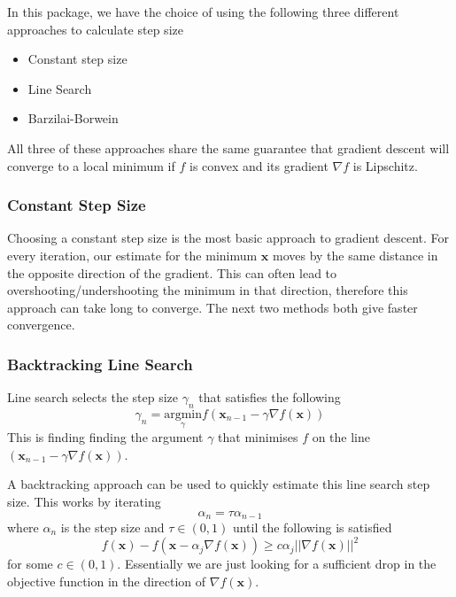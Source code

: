 \documentclass[12pt,]{article}
\providecommand{\tightlist}{%
  \setlength{\itemsep}{0pt}\setlength{\parskip}{0pt}}
\begin{document}
In this package, we have the choice of using the following three
different approaches to calculate step size

\begin{itemize}
\tightlist
\item
  Constant step size
\item
  Line Search
\item
  Barzilai-Borwein
\end{itemize}

All three of these approaches share the same guarantee that gradient
descent will converge to a local minimum if \(f\) is convex and its
gradient \(\nabla f\) is Lipschitz.

\hypertarget{constant-step-size}{%
\subsubsection{Constant Step Size}\label{constant-step-size}}

Choosing a constant step size is the most basic approach to gradient
descent. For every iteration, our estimate for the minimum
\(\mathbf{x}\) moves by the same distance in the opposite direction of
the gradient. This can often lead to overshooting/undershooting the
minimum in that direction, therefore this approach can take long to
converge. The next two methods both give faster convergence.

\hypertarget{backtracking-line-search}{%
\subsubsection{Backtracking Line
Search}\label{backtracking-line-search}}

Line search selects the step size \(\gamma_n\) that satisfies the
following
\[ \gamma_n = \underset{\gamma}{\text{argmin}} f(\mathbf{x}_{n-1} - \gamma\nabla f(\mathbf{x}))\]
This is finding finding the argument \(\gamma\) that minimises \(f\) on
the line \((\mathbf{x}_{n-1} - \gamma\nabla f(\mathbf{x}))\).

A backtracking approach can be used to quickly estimate this line search
step size. This works by iterating \[ \alpha_n = \tau \alpha_{n - 1}\]
where \(\alpha_n\) is the step size and \(\tau \in (0, 1)\) until the
following is satisfied
\[{f(\mathbf{x}) - f(\mathbf{x} - \alpha_j \nabla f(\mathbf{x}))} \ge c \alpha_j ||\nabla f(\mathbf{x})||^2\]
for some \(c \in (0, 1)\). Essentially we are just looking for a
sufficient drop in the objective function in the direction of
\(\nabla f(\mathbf{x})\).
\end{document}
